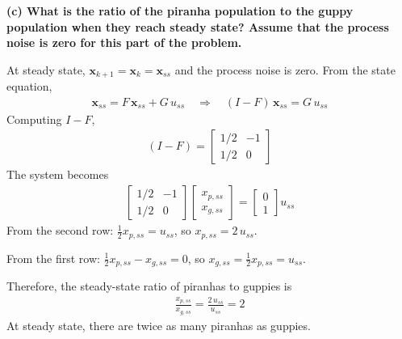 \documentclass[12pt]{article}
\begin{document}
\begin{stepbox}
\textbf{(c) What is the ratio of the piranha population to the guppy population when they reach steady state? Assume that the process noise is zero for this part of the problem.}

\vspace{0.3cm}

At steady state, $\mathbf{x}_{k+1} = \mathbf{x}_k = \mathbf{x}_{ss}$ and the process noise is zero. From the state equation,
\begin{align}
\mathbf{x}_{ss} = F\,\mathbf{x}_{ss} + G\,u_{ss} \quad\Longrightarrow\quad (I - F)\,\mathbf{x}_{ss} = G\,u_{ss}
\end{align}
Computing $I - F$,
\begin{align}
(I - F) = \begin{bmatrix} 1/2 & -1 \\ 1/2 & 0 \end{bmatrix}
\end{align}
The system becomes
\begin{align}
\begin{bmatrix} 1/2 & -1 \\ 1/2 & 0 \end{bmatrix}\begin{bmatrix} x_{p,ss} \\ x_{g,ss} \end{bmatrix} = \begin{bmatrix} 0 \\ 1 \end{bmatrix} u_{ss}
\end{align}
From the second row: $\frac{1}{2} x_{p,ss} = u_{ss}$, so $x_{p,ss} = 2\,u_{ss}$.

From the first row: $\frac{1}{2} x_{p,ss} - x_{g,ss} = 0$, so $x_{g,ss} = \frac{1}{2} x_{p,ss} = u_{ss}$.

Therefore, the steady-state ratio of piranhas to guppies is
\begin{align}
\boxed{\frac{x_{p,ss}}{x_{g,ss}} = \frac{2\,u_{ss}}{u_{ss}} = 2}
\end{align}
At steady state, there are twice as many piranhas as guppies.

\end{stepbox}
\end{document}
